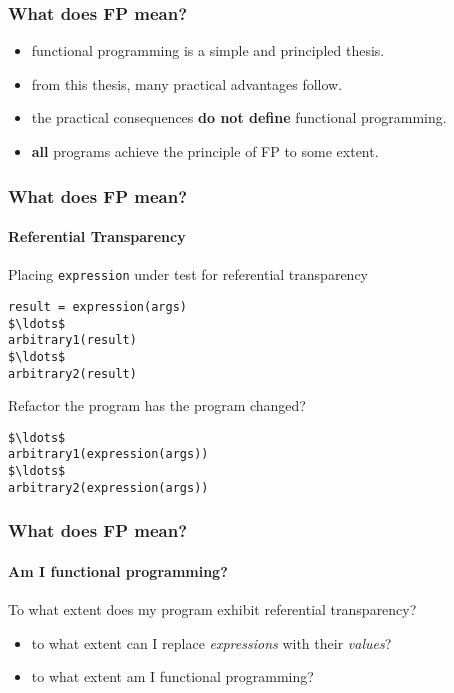 \begin{frame}
\frametitle{What does FP mean?}
\begin{itemize}
  \item<1-> functional programming is a simple and principled thesis.
  \item<1-> from this thesis, many practical advantages follow.
  \item<2-> the practical consequences \textbf{do not define} functional programming.
  \item<3-> \textbf{all} programs achieve the principle of FP to some extent.
\end{itemize}
\end{frame}

\begin{frame}[fragile]
\frametitle{What does FP mean?}
\framesubtitle{Referential Transparency}
\begin{block}{Placing \lstinline{expression} under test for referential transparency}
\scriptsize
\begin{lstlisting}[mathescape]
result = expression(args)
$\ldots$
arbitrary1(result)
$\ldots$
arbitrary2(result)
\end{lstlisting}
\end{block}
\begin{block}{Refactor the program \textemdash has the program changed?}
\scriptsize
\begin{lstlisting}[mathescape]
$\ldots$
arbitrary1(expression(args))
$\ldots$
arbitrary2(expression(args))
\end{lstlisting}
\end{block}
\end{frame}

\begin{frame}[fragile]
\frametitle{What does FP mean?}
\framesubtitle{Am I functional programming?}
\begin{block}{To what extent does my program exhibit referential transparency?}
\begin{itemize}
  \item<1-> to what extent can I replace \emph{expressions} with their \emph{values}?
  \item<2-> to what extent am I functional programming?
\end{itemize}
\end{block}
\end{frame}
